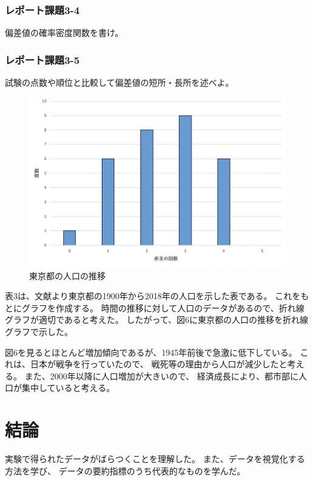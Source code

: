 \documentclass[12pt]{jarticle}
\begin{document}
\subsubsection*{レポート課題3-4}
\begin{shadebox}
    偏差値の確率密度関数を書け。
\end{shadebox}
\subsubsection*{レポート課題3-5}
\begin{shadebox}
    試験の点数や順位と比較して偏差値の短所・長所を述べよ。
\end{shadebox}
\clearpage
\begin{figure}[h]
    \begin{center}
        \includegraphics[scale=0.8]{kadai4_1graph1.png}
    \end{center}
    \caption{東京都の人口の推移}
    \label{fig6}
\end{figure}

表3は、文献\cite{paa}より東京都の1900年から2018年の人口を示した表である。
これをもとにグラフを作成する。
時間の推移に対して人口のデータがあるので、折れ線グラフが適切であると考えた。
したがって、図6に東京都の人口の推移を折れ線グラフで示した。

図6を見るとほとんど増加傾向であるが、1945年前後で急激に低下している。
これは、日本が戦争を行っていたので、
戦死等の理由から人口が減少したと考える。
また、2000年以降に人口増加が大きいので、
経済成長により、都市部に人口が集中していると考える。
\clearpage

\section{結論}
実験で得られたデータがばらつくことを理解した。
また、データを視覚化する方法を学び、
データの要約指標のうち代表的なものを学んだ。
\end{document}
